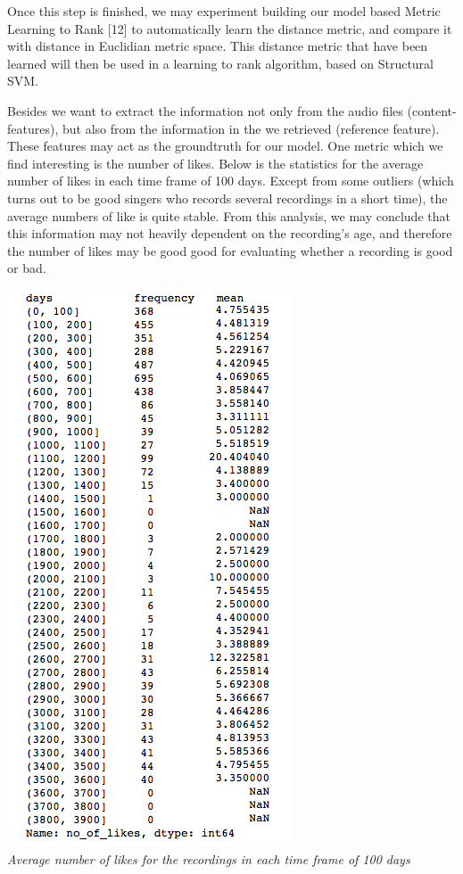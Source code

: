\documentclass[paper=a4, fontsize=11pt]{scrartcl}
\begin{document}
Once this step is finished, we may experiment building our model based Metric Learning to Rank [12] to automatically learn the distance metric, and compare it with distance in Euclidian metric space. This distance metric that have been learned will then be used in a learning to rank algorithm, based on Structural SVM.

Besides we want to extract the information not only from the audio files (content-features), but also from the information in the we retrieved (reference feature). These features may act as the groundtruth for our model. One metric which we find interesting is the number of likes.  Below is the statistics for the average number of likes in each time frame of 100 days. Except from some outliers (which turns out to be good singers who records several recordings in a short time), the average numbers of like is quite stable. From this analysis, we may conclude that this information may not heavily dependent on the recording's age, and therefore the number of likes may be good good for evaluating whether a recording is good or bad.

\begin{center}
\includegraphics[scale=0.3]{img/3.jpg}\\
\textit{Average number of likes for the recordings in each time frame of 100 days}\\
\end{center}
\end{document}
